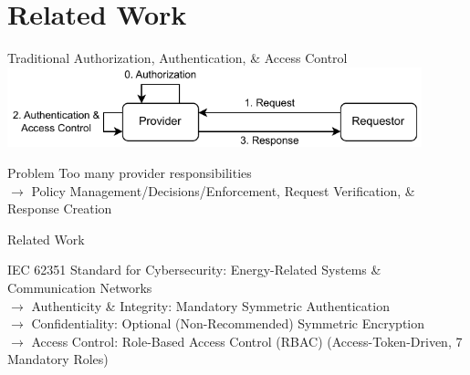 \documentclass[en]{sdqbeamer}
\begin{document}
\section{Related Work}
\begin{frame}{Traditional Authorization, Authentication, \& Access Control}
    \centering
	\includegraphics[width=0.9\textwidth]{./figures/access_control_request_traditional.drawio.pdf}
    \begin{redblock}{Problem}
        Too many provider responsibilities
        \\$\rightarrow$ Policy Management/Decisions/Enforcement, Request Verification, \& Response Creation
    \end{redblock}
\end{frame}
\begin{frame}{Related Work}
    \begin{blueblock}{IEC 62351 \parencite*{IEC62351P6,IEC62351P8}}
        Standard for Cybersecurity: Energy-Related Systems \& Communication Networks
        \\$\rightarrow$ Authenticity \& Integrity: Mandatory Symmetric Authentication
        \\$\rightarrow$ Confidentiality: Optional (Non-Recommended) Symmetric Encryption
        \\$\rightarrow$ Access Control: Role-Based Access Control (RBAC) (Access-Token-Driven, 7 Mandatory Roles)
    \end{blueblock}
\end{frame}
\end{document}
